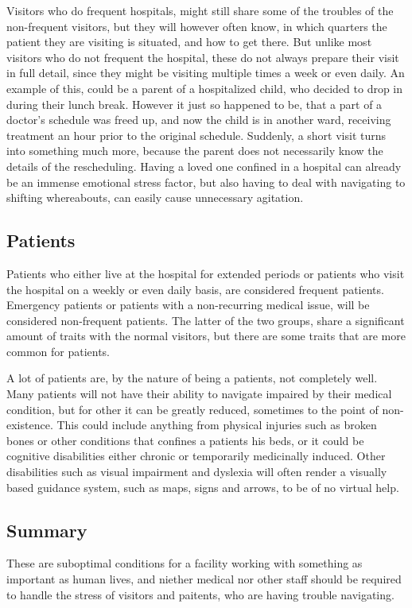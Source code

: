 Visitors who do frequent hospitals, might still share some of the troubles of the non-frequent visitors, but they will however often know, in which quarters the patient they are visiting is situated, and how to get there. But unlike most visitors who do not frequent the hospital, these do not always prepare their visit in full detail, since they might be visiting multiple times a week or even daily. An example of this, could be a parent of a hospitalized child, who decided to drop in during their lunch break. However it just so happened to be, that a part of a doctor's schedule was freed up, and now the child is in another ward, receiving treatment an hour prior to the original schedule. Suddenly, a short visit turns into something much more, because the parent does not necessarily know the details of the rescheduling. Having a loved one confined in a hospital can already be an immense emotional stress factor, but also having to deal with navigating to shifting whereabouts, can easily cause unnecessary agitation.

\subsection{Patients} %

Patients who either live at the hospital for extended periods or patients who visit the hospital on a weekly or even daily basis, are considered frequent patients. Emergency patients or patients with a non-recurring medical issue, will be considered non-frequent patients. The latter of the two groups, share a significant amount of traits with the normal visitors, but there are some traits that are more common for patients.

A lot of patients are, by the nature of being a patients, not completely well. Many patients will not have their ability to navigate impaired by their medical condition, but for other it can be greatly reduced, sometimes to the point of non-existence. This could include anything from physical injuries such as broken bones or other conditions that confines a patients his beds, or it could be cognitive disabilities either chronic or temporarily medicinally induced. Other disabilities such as visual impairment and dyslexia will often render a visually based guidance system, such as maps, signs and arrows, to be of no virtual help.\cite{visual_impairment}


\subsection{Summary}

These are suboptimal conditions for a facility working with something as important as human lives, and niether medical nor other staff should be required to handle the stress of visitors and paitents, who are having trouble navigating.


